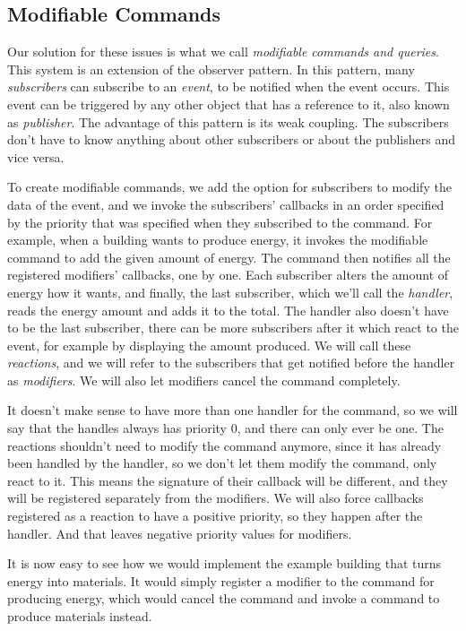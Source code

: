 \subsection{Modifiable Commands}

Our solution for these issues is what we call \emph{modifiable commands and queries}.
This system is an extension of the observer pattern.
In this pattern, many \emph{subscribers} can subscribe to an \emph{event}, to be notified when the event occurs.
This event can be triggered by any other object that has a reference to it, also known as \emph{publisher}.
The advantage of this pattern is its weak coupling.
The subscribers don't have to know anything about other subscribers or about the publishers and vice versa.

To create modifiable commands, we add the option for subscribers to modify the data of the event, and we invoke the subscribers' callbacks in an order specified by the priority that was specified when they subscribed to the command.
For example, when a building wants to produce energy, it invokes the modifiable command to add the given amount of energy.
The command then notifies all the registered modifiers' callbacks, one by one.
Each subscriber alters the amount of energy how it wants, and finally, the last subscriber, which we'll call the \emph{handler}, reads the energy amount and adds it to the total.
The handler also doesn't have to be the last subscriber, there can be more subscribers after it which react to the event, for example by displaying the amount produced.
We will call these \emph{reactions}, and we will refer to the subscribers that get notified before the handler as \emph{modifiers}.
We will also let modifiers cancel the command completely.

It doesn't make sense to have more than one handler for the command, so we will say that the handles always has priority 0, and there can only ever be one.
The reactions shouldn't need to modify the command anymore, since it has already been handled by the handler, so we don't let them modify the command, only react to it.
This means the signature of their callback will be different, and they will be registered separately from the modifiers.
We will also force callbacks registered as a reaction to have a positive priority, so they happen after the handler.
And that leaves negative priority values for modifiers.

It is now easy to see how we would implement the example building that turns energy into materials.
It would simply register a modifier to the command for producing energy, which would cancel the command and invoke a command to produce materials instead.

